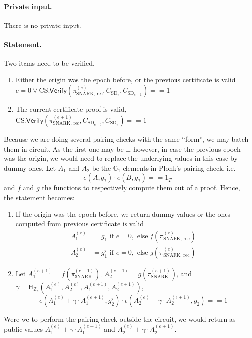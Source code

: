 \documentclass{article}
\newcommand{\isequal}{\ensuremath{==}\xspace}
\newcommand{\Zp}{\ensuremath{\mathbb{Z}_p}\xspace}
\newcommand{\G}[1]{\ensuremath{\mathbb{G}_{#1}}\xspace}
\newcommand{\Hash}[1]{\ensuremath{\textrm{H}_{#1}}\xspace}
\newcommand{\Verify}{\ensuremath{\mathsf{Verify}}\xspace}
\begin{document}
\paragraph{Private input.}
There is no private input.

\paragraph{Statement.}

Two items need to be verified,
\begin{enumerate}
    \item Either the origin was the epoch before, or the previous certificate is valid $e = 0 \lor \text{CS}.\Verify(\pi_\text{SNARK, rec}^{(e)}, C_{\text{SD}_e}, C_{\text{SD}_{e-1}}) == 1$
    \item The current certificate proof is valid,\\ $\text{CS}.\Verify(\pi_\text{SNARK, rec}^{(e+1)}, C_{\text{SD}_{e+1}}, C_{\text{SD}_{e}}) == 1$
\end{enumerate}

Because we are doing several pairing checks with the same ``form'', we may batch them in circuit. As the first one may be $\bot$ however, in case the previous epoch was the origin, we would need to replace the underlying values in this case by dummy ones. 
Let $A_1$ and $A_2$ be the $\G{1}$ elements in Plonk's pairing check, i.e. $$ e(A, g_2^\tau) \cdot e(B, g_2) \isequal 1_T$$ and $f$ and $g$ the functions to respectively compute them out of a proof.
Hence, the statement becomes:

\begin{enumerate}
    \item If the origin was the epoch before, we return dummy values or the ones computed from previous certificate is valid 
    \begin{align}
        A_1^{(e)} &= g_1 \text{ if } e = 0, \text{ else }f(\pi_\text{SNARK, rec}^{(e)})\\
        A_2^{(e)} &= g_1^\tau \text{ if } e = 0, \text{ else }g(\pi_\text{SNARK, rec}^{(e)})
    \end{align}
    \item Let $A_1^{(e+1)} = f(\pi_\text{SNARK}^{(e+1)})$, $A_2^{(e+1)} = g(\pi_\text{SNARK}^{(e+1)})$, and $\gamma = \Hash{\Zp}(A_1^{(e)}, A_2^{(e)}, A_1^{(e+1)}, A_2^{(e+1)})$,
    $$ e(A_1^{(e)} + \gamma \cdot A_1^{(e+1)}, g_2^\tau) \cdot e(A_2^{(e)} + \gamma \cdot A_2^{(e+1)}, g_2) \isequal 1 $$
\end{enumerate}

Were we to perform the pairing check outside the circuit, we would return as public values $A_1^{(e)} + \gamma \cdot A_1^{(e+1)}$ and $A_2^{(e)} + \gamma \cdot A_2^{(e+1)}$.

 
 
\end{document}
